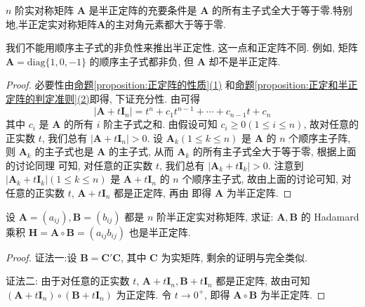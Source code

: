 \documentclass[../../main.tex]{subfiles}
\begin{document}
\begin{proposition}\label{proposition:半正定阵关于顺序主子式的性质}
\(n\) 阶实对称矩阵 \(\boldsymbol{A}\) 是半正定阵的充要条件是 \(\boldsymbol{A}\) 的所有主子式全大于等于零.特别地,半正定实对称矩阵$\boldsymbol{A}$的主对角元素都大于等于零.
\end{proposition}
\begin{remark}
我们不能用顺序主子式的非负性来推出半正定性, 这一点和正定阵不同. 例如, 矩阵 \(\boldsymbol{A}=\text{diag}\{1,0,-1\}\) 的顺序主子式都非负, 但 \(\boldsymbol{A}\) 却不是半正定阵. 
\end{remark}
\begin{proof}
必要性由\hyperref[proposition:正定阵的性质]{命题\ref{proposition:正定阵的性质}(1)} 和\hyperref[proposition:正定和半正定阵的判定准则]{命题\ref{proposition:正定和半正定阵的判定准则}(2)}即得, 下证充分性. 由可得
\[|\boldsymbol{A}+t\boldsymbol{I}_n|=t^n + c_1t^{n - 1}+\cdots + c_{n - 1}t + c_n\]
其中 \(c_i\) 是 \(\boldsymbol{A}\) 的所有 \(i\) 阶主子式之和. 由假设可知 \(c_i\geqslant 0(1\leqslant  i\leqslant  n)\), 故对任意的正实数 \(t\), 我们总有 \(|\boldsymbol{A}+t\boldsymbol{I}_n|>0\). 设 \(\boldsymbol{A}_k(1\leqslant  k\leqslant  n)\) 是 \(\boldsymbol{A}\) 的 \(n\) 个顺序主子阵, 则 \(\boldsymbol{A}_k\) 的主子式也是 \(\boldsymbol{A}\) 的主子式, 从而 \(\boldsymbol{A}_k\) 的所有主子式全大于等于零, 根据上面的讨论同理 可知, 对任意的正实数 \(t\), 我们总有 \(|\boldsymbol{A}_k + t\boldsymbol{I}_k|>0\). 注意到 \(|\boldsymbol{A}_k + t\boldsymbol{I}_k|(1\leqslant  k\leqslant  n)\) 是 \(\boldsymbol{A}+t\boldsymbol{I}_n\) 的 \(n\) 个顺序主子式, 故由上面的讨论可知, 对任意的正实数 \(t\), \(\boldsymbol{A}+t\boldsymbol{I}_n\) 都是正定阵, 再由 即得 \(\boldsymbol{A}\) 为半正定阵. 
\end{proof}

\begin{proposition}\label{proposition:半正定阵的Hadamard乘积性质}
设 \(\boldsymbol{A}=(a_{ij}),\boldsymbol{B}=(b_{ij})\) 都是 \(n\) 阶半正定实对称矩阵, 求证: \(\boldsymbol{A},\boldsymbol{B}\) 的 Hadamard 乘积 \(\boldsymbol{H}=\boldsymbol{A}\circ\boldsymbol{B}=(a_{ij}b_{ij})\) 也是半正定阵.
\end{proposition}
\begin{proof}
{\color{blue}证法一:}设 \(\boldsymbol{B}=\boldsymbol{C}'\boldsymbol{C}\), 其中 \(\boldsymbol{C}\) 为实矩阵, 剩余的证明与完全类似.

{\color{blue}证法二:} 由于对任意的正实数 \(t\), \(\boldsymbol{A}+t\boldsymbol{I}_n,\boldsymbol{B}+t\boldsymbol{I}_n\) 都是正定阵, 故由可知 \((\boldsymbol{A}+t\boldsymbol{I}_n)\circ(\boldsymbol{B}+t\boldsymbol{I}_n)\) 为正定阵. 令 \(t\to0^+\), 即得 \(\boldsymbol{A}\circ\boldsymbol{B}\) 为半正定阵.
\end{proof}
\end{document}
